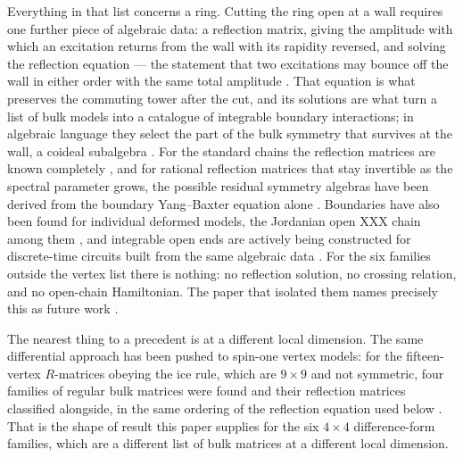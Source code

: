 \documentclass[11pt,reqno]{amsart}
\theoremstyle{plain}
\theoremstyle{definition}
\theoremstyle{remark}
\numberwithin{equation}{section}
\begin{document}
Everything in that list concerns a ring. Cutting the ring open at a wall requires
one further piece of algebraic data: a reflection matrix, giving the amplitude
with which an excitation returns from the wall with its rapidity reversed, and
solving the reflection equation --- the statement that two excitations may bounce
off the wall in either order with the same total amplitude
\cite{cherednik1984,Sklyanin_1987bc,sklyanin1988}. That equation is what
preserves the commuting tower after the cut, and its solutions are what turn a
list of bulk models into a catalogue of integrable boundary interactions; in
algebraic language they select the part of the bulk symmetry that survives at the
wall, a coideal subalgebra \cite{kulish1992,Kolb_2009re,Balagovic_2016uk}. For
the standard chains the reflection matrices are known completely
\cite{devega1994}, and for rational reflection matrices that stay invertible as
the spectral parameter grows, the possible residual symmetry algebras have been
derived from the boundary Yang--Baxter equation alone \cite{Gombor_2020ot}. Boundaries have also been found for
individual deformed models, the Jordanian open XXX chain among them
\cite{kulish2010}, and integrable open ends are actively being constructed for
discrete-time circuits built from the same algebraic data
\cite{paletta2025,garciaFernandez2026}. For the six families outside the vertex
list there is nothing: no reflection solution, no crossing relation, and no
open-chain Hamiltonian. The paper that isolated them names precisely this as
future work \cite{deLeeuw2019}.

The nearest thing to a precedent is at a different local dimension. The same
differential approach has been pushed to spin-one vertex models: for the
fifteen-vertex $R$-matrices obeying the ice rule, which are $9\times9$ and not
symmetric, four families of regular bulk matrices were found and their
reflection matrices classified alongside, in the same ordering of the reflection
equation used below \cite{Vieira_2019fv}. That is the shape of result this paper
supplies for the six $4\times4$ difference-form families, which are a different
list of bulk matrices at a different local dimension.
\end{document}
